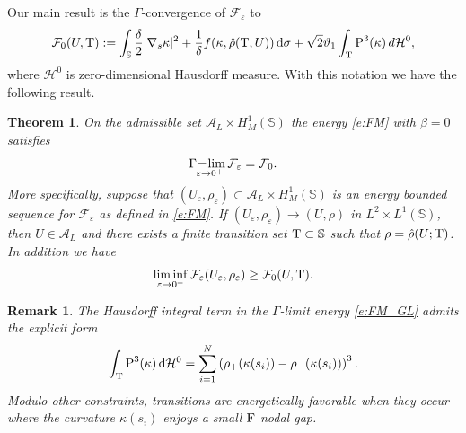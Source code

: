 \documentclass[11pt]{amsart}
\theoremstyle{plain}
\newcommand{\beq}{\begin{equation}}
\newcommand{\eeq}{\end{equation}}
\def\cA{{\mathcal A}}
\def\cF{{\mathcal F}}
\def\cH{{\mathcal H}}
\def\mbbS{\mathbb{S}}
\def\mrF{\textrm F}
\def\mrP{\textrm P}
\def\mrT{\textrm T}
\def\mrd{\textrm d}
\def\eps{\varepsilon}
\def\cF{{\mathcal F}}
\def\rmd{\mathrm d}
\numberwithin{equation}{section}
\theoremstyle{plain}
\newtheorem{thm}{Theorem}
\newtheorem{remark}{Remark}
\begin{document}
Our main result is the $\Gamma$-convergence of $\cF_\eps$ to
\beq\label{e:cF0-def}
\cF_0(U,\mrT)
:=  \int_{\mbbS}\frac{\delta}{2}|\nabla_s \kappa|^2+\frac{1}{\delta} f(\kappa, \hat \rho(\mrT,U))\,\rmd\sigma + \sqrt{2}\vartheta_1 \int_{\mrT}\mrP^3(\kappa)\, d\mathcal{H}^0,
\eeq
where $\cH^0$ is zero-dimensional Hausdorff measure.
With this notation we have the following result.
\begin{thm}On the admissible set $\cA_L\times H^1_M(\mbbS)$ the energy \eqref{e:FM} with $\beta=0$ satisfies
\beq
\label{e:Gamma-NE}
\Gamma\!-\!\lim\limits_{\hspace{-0.15in}\eps\to0^+}\cF_\eps =
\cF_0.
\eeq
More specifically, suppose that $(U_\eps,\rho_\eps)\subset \cA_L\times H_M^1(\mbbS)$  is an energy bounded sequence for $\cF_\eps$ as defined in \eqref{e:FM}. If $(U_\eps,\rho_\eps)\to (U,\rho)$ in $L^2\times L^1(\mbbS)$, then
  $U\in\cA_L$ and there exists a finite transition set $\mrT\subset\mbbS$  such that  $\rho=\hat\rho(U;\mrT)$. In addition we have  $$\liminf\limits_{\eps\to0^+} \cF_\eps(U_\eps,\rho_\eps)\geq \cF_0(U,\mrT).$$
\end{thm}

\begin{remark}
    The Hausdorff integral term in the $\Gamma$-limit energy \eqref{e:FM_GL} admits the explicit form
    $$\int_\mrT \mrP^3(\kappa)\,\mrd \cH^0 = \sum_{i=1}^N \left(\rho_+(\kappa(s_i))-\rho_-(\kappa(s_i))\right)^3.$$
   Modulo other constraints,  transitions are energetically favorable when they occur where the curvature $\kappa(s_i)$ enjoys a small $\mrF$ nodal gap.
\end{remark}
\end{document}
